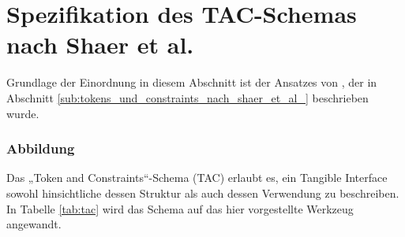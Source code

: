
\section{Spezifikation des TAC-Schemas nach Shaer et al.} %
\label{sec:spezifikation_des_tac_schemas_nach_shaer_et_al_}

Grundlage der Einordnung in diesem Abschnitt ist der Ansatzes von \citet{Shaer04}, der in Abschnitt \ref{sub:tokens_und_constraints_nach_shaer_et_al_} beschrieben wurde.

\subsubsection{Abbildung}

Das „Token and Constraints“-Schema (\gls{TAC}) erlaubt es, ein Tangible Interface sowohl hinsichtliche dessen Struktur als auch dessen Verwendung zu beschreiben. In Tabelle \ref{tab:tac} wird das Schema auf das hier vorgestellte Werkzeug angewandt. 

